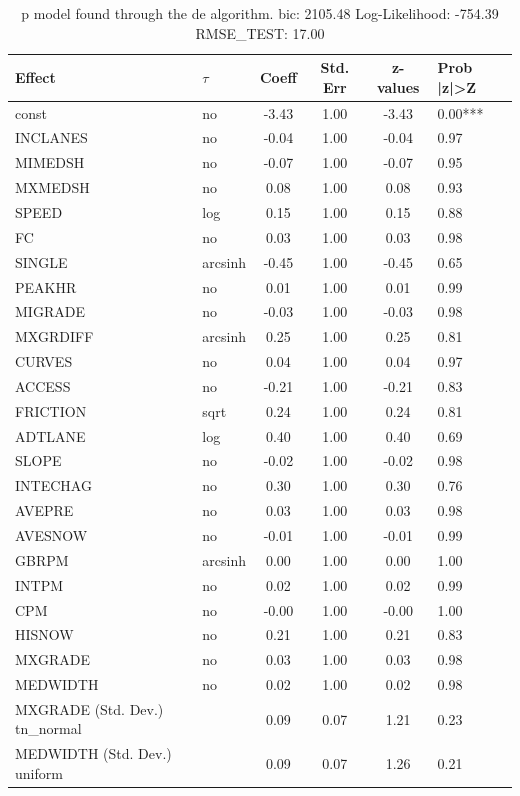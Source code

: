 \begin{table}
	\caption{p model found through the de algorithm. bic: 2105.48 Log-Likelihood: -754.39 RMSE_TEST: 17.00}
	\begin{center}
		\begin{tabular}{|l|l|c|c|c|l|}
			\hline
			Effect & $\tau$ & Coeff & Std. Err & z-values & Prob |z|>Z \\
			\hline
			const & no & -3.43 & 1.00 & -3.43 & 0.00*** \\
			\hline
			INCLANES & no & -0.04 & 1.00 & -0.04 & 0.97 \\
			\hline
			MIMEDSH & no & -0.07 & 1.00 & -0.07 & 0.95 \\
			\hline
			MXMEDSH & no & 0.08 & 1.00 & 0.08 & 0.93 \\
			\hline
			SPEED & log & 0.15 & 1.00 & 0.15 & 0.88 \\
			\hline
			FC & no & 0.03 & 1.00 & 0.03 & 0.98 \\
			\hline
			SINGLE & arcsinh & -0.45 & 1.00 & -0.45 & 0.65 \\
			\hline
			PEAKHR & no & 0.01 & 1.00 & 0.01 & 0.99 \\
			\hline
			MIGRADE & no & -0.03 & 1.00 & -0.03 & 0.98 \\
			\hline
			MXGRDIFF & arcsinh & 0.25 & 1.00 & 0.25 & 0.81 \\
			\hline
			CURVES & no & 0.04 & 1.00 & 0.04 & 0.97 \\
			\hline
			ACCESS & no & -0.21 & 1.00 & -0.21 & 0.83 \\
			\hline
			FRICTION & sqrt & 0.24 & 1.00 & 0.24 & 0.81 \\
			\hline
			ADTLANE & log & 0.40 & 1.00 & 0.40 & 0.69 \\
			\hline
			SLOPE & no & -0.02 & 1.00 & -0.02 & 0.98 \\
			\hline
			INTECHAG & no & 0.30 & 1.00 & 0.30 & 0.76 \\
			\hline
			AVEPRE & no & 0.03 & 1.00 & 0.03 & 0.98 \\
			\hline
			AVESNOW & no & -0.01 & 1.00 & -0.01 & 0.99 \\
			\hline
			GBRPM & arcsinh & 0.00 & 1.00 & 0.00 & 1.00 \\
			\hline
			INTPM & no & 0.02 & 1.00 & 0.02 & 0.99 \\
			\hline
			CPM & no & -0.00 & 1.00 & -0.00 & 1.00 \\
			\hline
			HISNOW & no & 0.21 & 1.00 & 0.21 & 0.83 \\
			\hline
			MXGRADE & no & 0.03 & 1.00 & 0.03 & 0.98 \\
			\hline
			MEDWIDTH & no & 0.02 & 1.00 & 0.02 & 0.98 \\
			\hline
			MXGRADE (Std. Dev.) tn_normal &  & 0.09 & 0.07 & 1.21 & 0.23 \\
			\hline
			MEDWIDTH (Std. Dev.) uniform &  & 0.09 & 0.07 & 1.26 & 0.21 \\
			\hline
		\end{tabular}
	\end{center}
\end{table}